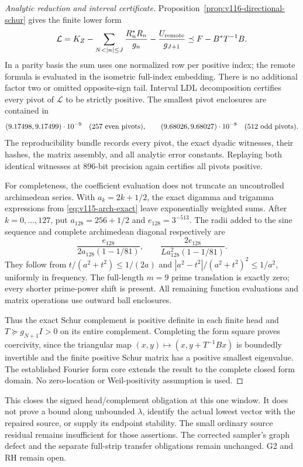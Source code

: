 \begin{proof}[Analytic reduction and interval certificate]
Proposition~\ref{prop:v116-directional-schur} gives the finite lower form
\begin{equation}\label{eq:v116-certified-lower}
 \mathcal L=K_Z-
 \sum_{N<|n|\le J}\frac{R_n^*R_n}{g_n}
 -\frac{U_{\rm remote}}{g_{J+1}}
 \preceq F-B^*T^{-1}B.
\end{equation}
In a parity basis the sum uses one normalized row per positive index;
the remote formula is evaluated in the isometric full-index embedding.
There is no additional factor two or omitted opposite-sign tail.
Interval LDL decomposition certifies every pivot of $\mathcal L$ to
be strictly positive. The smallest pivot enclosures are contained in
\[
 (9.17498,9.17499)\cdot10^{-9}\quad\hbox{(257 even pivots)},
 \qquad
 (9.68026,9.68027)\cdot10^{-8}\quad\hbox{(512 odd pivots)}.
\]
The reproducibility bundle records every pivot, the exact dyadic
witnesses, their hashes, the matrix assembly, and all analytic error
constants. Replaying both identical witnesses at 896-bit precision
again certifies all pivots positive.

For completeness, the coefficient evaluation does not truncate an
uncontrolled archimedean series. With $a_k=2k+1/2$, the exact
digamma and trigamma expressions from
\eqref{eq:v115-arch-exact} leave exponentially weighted sums.
After $k=0,\ldots,127$, put $a_{128}=256+1/2$ and
$e_{128}=3^{-513}$. The radii added to the sine sequence and
complete archimedean diagonal respectively are
\[
 \frac{e_{128}}{2a_{128}(1-1/81)},\qquad
 \frac{2e_{128}}{La_{128}^2(1-1/81)}.
\]
They follow from $t/(a^2+t^2)\le1/(2a)$ and
$|a^2-t^2|/(a^2+t^2)^2\le1/a^2$, uniformly in frequency.
The full-length $m=9$ prime translation is exactly zero; every
shorter prime-power shift is present. All remaining function evaluations
and matrix operations use outward ball enclosures.

Thus the exact Schur complement is positive definite in each finite
head and $T\succeq g_{N+1}I>0$ on its entire complement. Completing
the form square proves coercivity, since the triangular map
$(x,y)\mapsto(x,y+T^{-1}Bx)$ is boundedly invertible and the finite
positive Schur matrix has a positive smallest eigenvalue. The established
Fourier form core extends the result to the complete closed form domain.
No zero-location or Weil-positivity assumption is used.
\end{proof}

This closes the signed head/complement obligation at this one window.
It does not prove a bound along unbounded $\lambda$, identify the
actual lowest vector with the repaired source, or supply its endpoint
stability. The small ordinary source residual remains insufficient for
those assertions. The corrected sampler's graph defect and the separate
full-strip transfer obligations remain unchanged. G2 and RH remain open.

